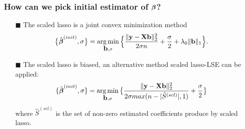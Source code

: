 \begin{frame}
\frametitle{How can we pick initial estimator of $\mbox{\boldmath $\beta$}$?}
\begin{itemize}
\item[$\blacksquare$] The scaled lasso is a joint convex minimization method
\begin{equation}
\big\{\hat{\mbox{\boldmath $\beta$}}^{(init)},\sigma\big\} = \mathop{\arg\min}_{\mbox{\bf b},\sigma}
\Big\{\frac{\|\mbox{\bf y}-\mbox{\bf X}\mbox{\bf b}\|_2^2}{2\sigma n} + \frac{\sigma}{2}+\lambda_0\|\mbox{\bf b}\|_1\Big\}.
\end{equation}
\item[$\blacksquare$] The scaled lasso is biased, an alternative method scaled lasso-LSE can be applied:
\begin{equation}
\{\hat{\mbox{\boldmath $\beta$}}^{(init)},\sigma\} = \mathop{\arg\min}_{\mbox{\bf b},\sigma}
\big\{\frac{\|\mbox{\bf y}-\mbox{\bf X}\mbox{\bf b}\|_2^2}{2\sigma max(n-|\hat{S}^{(scl)}|,1)} + \frac{\sigma}{2}\big\}
\end{equation}
where $\hat{S}^{(scl)}$ is the set of non-zero estimated coefficients produce by scaled lasso.
\end{itemize}
\end{frame}




